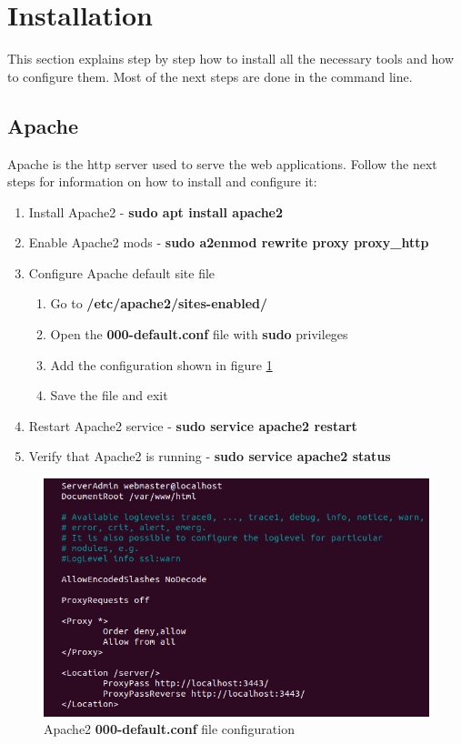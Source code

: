 \section{Installation}

This section explains step by step how to install all the necessary tools and how to configure them. Most of the next steps are done in the command line.

\subsection{Apache}

Apache is the http server used to serve the web applications. Follow the next steps for information on how to install and configure it:

\begin{enumerate}
    \item Install Apache2 - \textbf{sudo apt install apache2}
    \item Enable Apache2 mods - \textbf{sudo a2enmod rewrite proxy proxy\_http}
    \item Configure Apache default site file
    \begin{enumerate}
        \item Go to \textbf{/etc/apache2/sites-enabled/}
        \item Open the \textbf{000-default.conf} file with \textbf{sudo} privileges
        \item Add the configuration shown in figure \ref{fig:apache_config}
        \item Save the file and exit
    \end{enumerate}
    \item Restart Apache2 service - \textbf{sudo service apache2 restart}
    \item Verify that Apache2 is running - \textbf{sudo service apache2 status}
\end{enumerate}

\begin{figure}[ht]
    \centering
    \includegraphics[width=\linewidth]{lib/images/installation/apache/apache_config.png}
    \caption{Apache2 \textbf{000-default.conf} file configuration}
    \label{fig:apache_config}
\end{figure}

